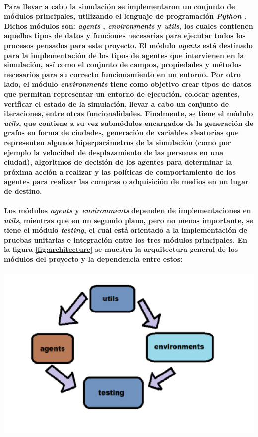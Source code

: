 \documentclass[12pt]{amsart}
\begin{document}
\paragraph{Para llevar a cabo la simulación se implementaron un conjunto de módulos principales, utilizando el lenguaje de programación \textit{Python} \cite{python}. Dichos módulos son: \textit{agents} , \textit{environments} y \textit{utils}, los cuales contienen aquellos tipos de datos y funciones necesarias para ejecutar todos los procesos pensados para este proyecto. El módulo \textit{agents} está destinado para la implementación de los tipos de agentes que intervienen en la simulación, así como el conjunto de campos, propiedades y métodos necesarios para su correcto funcionamiento en un entorno. Por otro lado, el módulo \textit{environments} tiene como objetivo crear tipos de datos que permitan representar un entorno de ejecución, colocar agentes, verificar el estado de la simulación, llevar a cabo un conjunto de iteraciones, entre otras funcionalidades. Finalmente, se tiene el módulo \textit{utils}, que contiene a su vez submódulos encargados de la generación de grafos en forma de ciudades, generación de variables aleatorias que representen algunos hiperparámetros de la simulación (como por ejemplo la velocidad de desplazamiento de las personas en una ciudad), algoritmos de decisión de los agentes para determinar la próxima acción a realizar y las políticas de comportamiento de los agentes para realizar las compras o adquisición de medios en un lugar de destino.}

\paragraph{Los módulos \textit{agents} y \textit{environments} dependen de implementaciones en \textit{utils}, mientras que en un segundo plano, pero no menos importante, se tiene el módulo \textit{testing}, el cual está orientado a la implementación de pruebas unitarias e integración entre los tres módulos principales. En la figura \ref{fig:architecture} se muestra la arquitectura general de los módulos del proyecto y la dependencia entre estos:}

\begin{center}
	\includegraphics[scale=0.8]{./images/architecture.png}
	\label{fig:architecture}
\end{center}
\vskip 1.5cm
\end{document}
